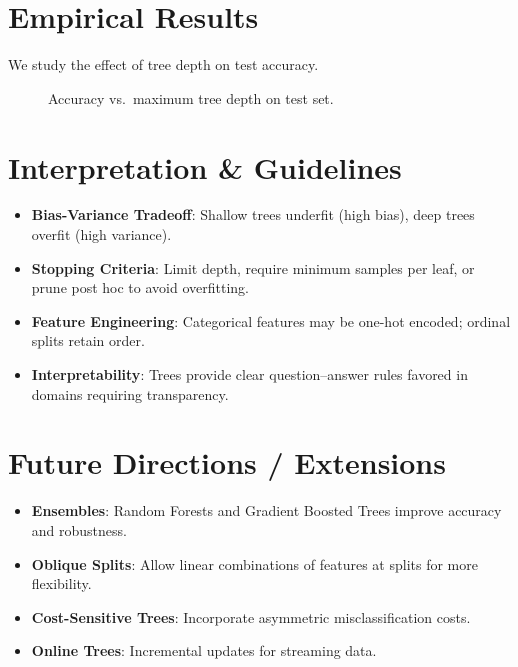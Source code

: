 \documentclass[11pt]{article}
\begin{document}
\section{Empirical Results}
We study the effect of tree depth on test accuracy.
\begin{figure}[h]
  \centering
  \caption{Accuracy vs.\ maximum tree depth on test set.}
\end{figure}

\section{Interpretation \& Guidelines}
\begin{itemize}
  \item \textbf{Bias-Variance Tradeoff}: Shallow trees underfit (high bias), deep trees overfit (high variance).
  \item \textbf{Stopping Criteria}: Limit depth, require minimum samples per leaf, or prune post hoc to avoid overfitting.
  \item \textbf{Feature Engineering}: Categorical features may be one-hot encoded; ordinal splits retain order.
  \item \textbf{Interpretability}: Trees provide clear question–answer rules favored in domains requiring transparency.
\end{itemize}

\section{Future Directions / Extensions}
\begin{itemize}
  \item \textbf{Ensembles}: Random Forests and Gradient Boosted Trees improve accuracy and robustness.
  \item \textbf{Oblique Splits}: Allow linear combinations of features at splits for more flexibility.
  \item \textbf{Cost-Sensitive Trees}: Incorporate asymmetric misclassification costs.
  \item \textbf{Online Trees}: Incremental updates for streaming data.
\end{itemize}
\end{document}
